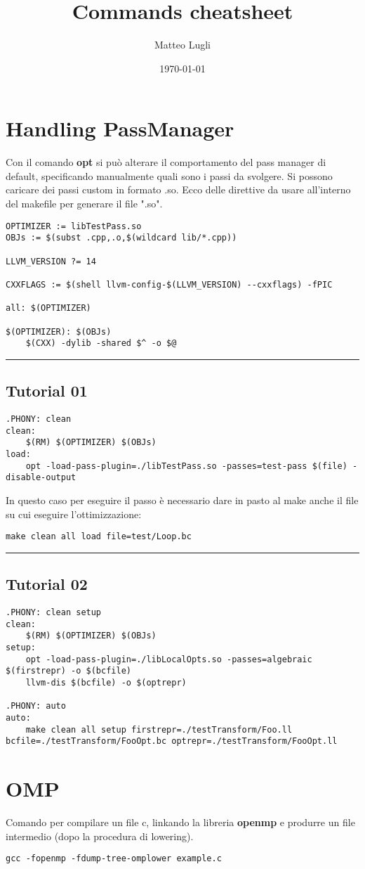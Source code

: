 \documentclass[11pt]{article}
\author{Matteo Lugli}
\date{\today}
\title{\textbf{Commands cheatsheet}}
\begin{document}
\maketitle
\section{Handling PassManager}
\label{sec:orgc82caa7}
Con il comando \textbf{opt} si può alterare il comportamento del
pass manager di default, specificando manualmente quali 
sono i passi da svolgere. Si possono caricare dei passi
custom in formato .so.
Ecco delle direttive da usare all'interno del makefile per generare
il file ".so".
\begin{verbatim}
OPTIMIZER := libTestPass.so
OBJs := $(subst .cpp,.o,$(wildcard lib/*.cpp))

LLVM_VERSION ?= 14

CXXFLAGS := $(shell llvm-config-$(LLVM_VERSION) --cxxflags) -fPIC

all: $(OPTIMIZER) 

$(OPTIMIZER): $(OBJs)
	$(CXX) -dylib -shared $^ -o $@
\end{verbatim}

\noindent\rule{\textwidth}{0.5pt}
\subsection{Tutorial 01}
\label{sec:orgf7eb6e5}
\begin{verbatim}
.PHONY: clean
clean:
	$(RM) $(OPTIMIZER) $(OBJs)
load:
	opt -load-pass-plugin=./libTestPass.so -passes=test-pass $(file) -disable-output
\end{verbatim}
In questo caso per eseguire il passo è necessario dare in pasto al make anche
il file su cui eseguire l'ottimizzazione: 
\begin{verbatim}
make clean all load file=test/Loop.bc
\end{verbatim}

\noindent\rule{\textwidth}{0.5pt}
\subsection{Tutorial 02}
\label{sec:org59e8a41}
\begin{verbatim}
.PHONY: clean setup
clean:
	$(RM) $(OPTIMIZER) $(OBJs)
setup:
	opt -load-pass-plugin=./libLocalOpts.so -passes=algebraic $(firstrepr) -o $(bcfile)
	llvm-dis $(bcfile) -o $(optrepr)

.PHONY: auto
auto:
	make clean all setup firstrepr=./testTransform/Foo.ll bcfile=./testTransform/FooOpt.bc optrepr=./testTransform/FooOpt.ll
\end{verbatim}
\section{OMP}
\label{sec:org8c42ecc}
Comando per compilare un file c, linkando la libreria \textbf{openmp} e 
produrre un file intermedio (dopo la procedura di lowering).
\begin{verbatim}
gcc -fopenmp -fdump-tree-omplower example.c  
\end{verbatim}
\end{document}
